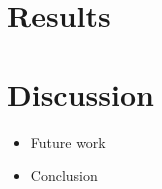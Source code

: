 \documentclass[10pt,a4paper]{article}
\begin{document}
\section{Results}



\section{Discussion}

\begin{itemize}
\item Future work
\item Conclusion
\end{itemize}



\end{document}
